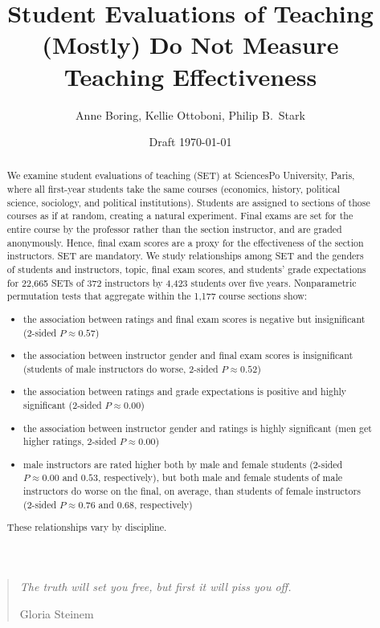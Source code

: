 \documentclass[12pt]{article}
\title{Student Evaluations of Teaching (Mostly) Do Not Measure Teaching Effectiveness}
\author{Anne Boring, Kellie Ottoboni, Philip B.~Stark}
\date{Draft \today}
\begin{document}
\maketitle

\newpage
\begin{quotation}
    \emph{The truth will set you free, but first it will piss you off.}
    
     \hfill Gloria Steinem

\begin{abstract}
We examine student evaluations of teaching (SET) at SciencesPo
University, Paris, where all
first-year students take the same courses 
(economics, history, political science, sociology, and political institutions). 
Students are assigned to sections of those courses as if at random, creating a natural experiment.
Final exams are set for the entire course
by the professor rather than the section instructor, and are graded anonymously.
Hence, final exam scores are a proxy for the effectiveness of the section instructors.
SET are mandatory.
We study relationships among SET and the genders of students and
instructors, topic, final exam scores, and students' grade expectations
for 22,665 SETs of 372 instructors by 4,423 students over five years.
Nonparametric permutation tests that aggregate within the 1,177 course sections show: 
\begin{itemize}
   \item the association between ratings and final 
            exam scores is negative but insignificant
            (2-sided $P \approx 0.57$)
   \item the association between instructor gender 
            and final exam scores is insignificant
            (students of male instructors do worse, 2-sided $P \approx 0.52$)
   \item the association between ratings and grade 
            expectations is positive and highly significant
            (2-sided $P \approx 0.00$)
   \item the association between instructor 
            gender and ratings is highly significant 
            (men get higher ratings, 2-sided $P \approx 0.00$)
   \item male instructors are rated higher both by male and
            female students (2-sided $P \approx 0.00$ and $0.53$, respectively), but both 
            male and female students of male instructors do worse on the final, on average, 
            than students of female instructors (2-sided $P \approx 0.76$ and $0.68$, respectively)
\end{itemize}
These relationships vary by discipline.

\end{abstract}

\newpage

\end{quotation}
\end{document}
